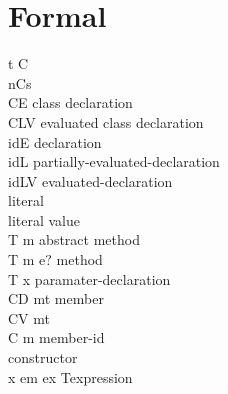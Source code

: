 \section{Formal} 
\begin{bnf}
     {t \mmid{} C}                                                      {}\\      {nCs}                                                 {}\\     {C\Q{=}E}                                                          {class declaration}\\     {C\Q{=}LV}                                                         {evaluated class declaration}\\      {id\Q{=}E}                                                         {declaration}\\     {id\Q{=}L}                                                         {partially-evaluated-declaration}\\     {id\Q{=}LV}                                                       {evaluated-declaration}\\      {  \mmid{} }        {literal}\\     {  \mmid{} }       {literal value}\\    {T m}                                                      {abstract method}\\     {T m e$?$}                                                 {method}\\     {T x}                                                              {paramater-declaration}\\      {CD \mmid{} mt}                                                    {member}\\     {CV \mmid{} mt}                                                    {}\\    {C \mmid{} m}                                                      {member-id}\\      {}                                          {constructor}\\      {x \mmid{} em \mmid{} ex \mmid{}  T}{expression}\\\production{%
}
\end{bnf}
